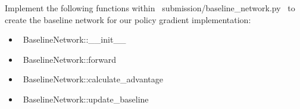 \item {}

Implement the following functions within ~submission/baseline_network.py~ to create the baseline network for our policy gradient implementation: 

\begin{itemize}
	\item ~BaselineNetwork::__init__~ 
	\item ~BaselineNetwork::forward~ 
	\item ~BaselineNetwork::calculate_advantage~ 
	\item ~BaselineNetwork::update_baseline~
\end{itemize}